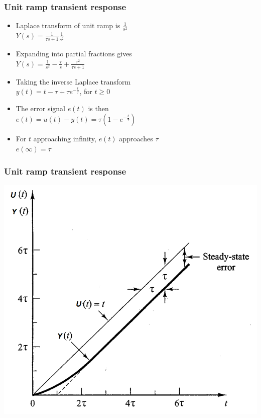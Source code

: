 \begin{frame}
\frametitle{Unit ramp transient response}
\begin{itemize}
\vspace{0.25cm}
\item Laplace transform of unit ramp is $\frac{1}{s^2}$
\vspace{0.25cm}
\\ $Y(s) = \frac{1}{\tau s +1} \frac{1}{s^2}$
\vspace{0.25cm}
\item Expanding into partial fractions gives
\vspace{0.25cm}
\\ $Y(s)= \frac{1}{s^2} - \frac{\tau}{s} + \frac{\tau^2}{\tau s +1}$
\vspace{0.25cm}
\item Taking the inverse Laplace transform 
\vspace{0.25cm}
\\ $y(t) = t -\tau + \tau e^{-\frac{t}{\tau}}$, for $t\ge 0$
\vspace{0.25cm}
\item The error signal $e(t)$ is then
\vspace{0.25cm}
\\ $e(t)=u(t) -y(t) = \tau(1-e^{-\frac{t}{\tau}})$
\vspace{0.25cm}
\item For $t$ approaching infinity, $e(t)$ approaches $\tau$
\vspace{0.25cm}
\\ $e(\infty) = \tau$
\end {itemize}
\end{frame}

\begin{frame}
\frametitle{Unit ramp transient response}
\includegraphics[width=0.8\linewidth]{Afbeelding4}
\end{frame}

